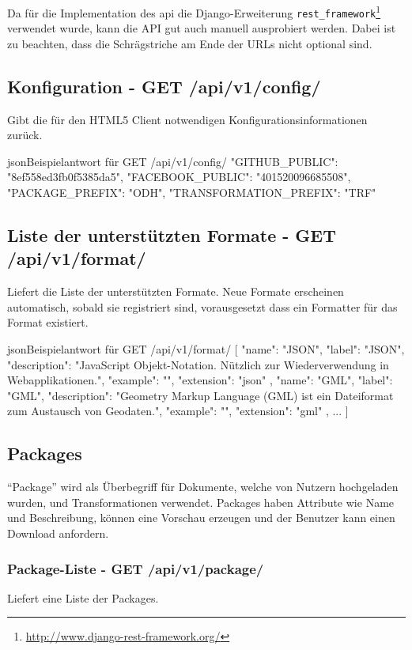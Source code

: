 Da für die Implementation des \gls{api} die Django-Erweiterung \texttt{rest\_framework}\footnote{\url{http://www.django-rest-framework.org/}} verwendet wurde, kann die API gut auch manuell ausprobiert werden. Dabei ist zu beachten, dass die Schrägstriche am Ende der URLs nicht optional sind.

\subsection{Konfiguration - GET /api/v1/config/}
Gibt die für den HTML5 Client notwendigen Konfigurationsinformationen zurück.

\begin{srclst}{json}{Beispielantwort für GET /api/v1/config/}
{
  "GITHUB_PUBLIC": "8ef558ed3fb0f5385da5", 
  "FACEBOOK_PUBLIC": "401520096685508", 
  "PACKAGE_PREFIX": "ODH", 
  "TRANSFORMATION_PREFIX": "TRF"
}
\end{srclst}

\subsection{Liste der unterstützten Formate - GET /api/v1/format/} \label{sec:pd:api-format}
Liefert die Liste der unterstützten Formate. Neue Formate erscheinen automatisch, sobald sie registriert sind, vorausgesetzt dass ein Formatter für das Format existiert.

\begin{srclst}{json}{Beispielantwort für GET /api/v1/format/}
[
    {
        "name": "JSON", 
        "label": "JSON", 
        "description": "JavaScript Objekt-Notation. Nützlich zur Wiederverwendung in Webapplikationen.", 
        "example": "", 
        "extension": "json"
    }, 
    {
        "name": "GML", 
        "label": "GML", 
        "description": "Geometry Markup Language (GML) ist ein Dateiformat zum Austausch von Geodaten.", 
        "example": "", 
        "extension": "gml"
    }, 
    ...
]
\end{srclst}

\subsection{Packages}
``Package'' wird als Überbegriff für Dokumente, welche von Nutzern hochgeladen wurden, und Transformationen verwendet. Packages haben Attribute wie Name und Beschreibung, können eine Vorschau erzeugen und der Benutzer kann einen Download anfordern.

\subsubsection{Package-Liste - GET /api/v1/package/}\label{sec:pd:api-package-list}
Liefert eine Liste der Packages.

